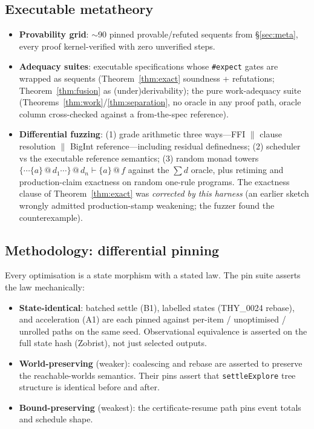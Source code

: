 \documentclass[11pt]{article}
\makeatletter
\newcommand{\lax}[2]{\{#1\}\mathbin{@}#2}       %
\theoremstyle{definition}
\theoremstyle{remark}
\makeatother
\begin{document}
\subsection{Executable metatheory}

\begin{itemize}
\item \textbf{Provability grid}: $\sim$90 pinned provable/refuted sequents from
  \S\ref{sec:meta}, every proof kernel-verified with zero unverified steps.
\item \textbf{Adequacy suites}: executable specifications whose \texttt{\#expect}
  gates are wrapped as sequents (Theorem~\ref{thm:exact} soundness + refutations;
  Theorem~\ref{thm:fusion} as (under)derivability); the pure work-adequacy suite
  (Theorems~\ref{thm:work}/\ref{thm:separation}, no oracle in any proof path,
  oracle column cross-checked against a from-the-spec reference).
\item \textbf{Differential fuzzing}: (1) grade arithmetic three ways---FFI $\|$
  clause resolution $\|$ BigInt reference---including residual definedness; (2)
  scheduler vs the executable reference semantics; (3) random monad towers
  $\lax{\cdots\lax{a}{d_1}\cdots}{d_n} \vdash \lax{a}{f}$ against the $\sum d$
  oracle, plus retiming and production-claim exactness on random one-rule programs.
  The exactness clause of Theorem~\ref{thm:exact} was \emph{corrected by this
  harness} (an earlier sketch wrongly admitted production-stamp weakening; the
  fuzzer found the counterexample).
\end{itemize}

\subsection{Methodology: differential pinning}

Every optimisation is a state morphism with a stated law.  The pin suite asserts
the law mechanically:

\begin{itemize}
\item \textbf{State-identical}: batched settle (B1), labelled states
  (THY\_0024 rebase), and acceleration (A1) are each pinned against per-item /
  unoptimised / unrolled paths on the same seed.  Observational equivalence is
  asserted on the full state hash (Zobrist), not just selected outputs.
\item \textbf{World-preserving} (weaker): coalescing and rebase are asserted to
  preserve the reachable-worlds semantics.  Their pins assert that
  \texttt{settleExplore} tree structure is identical before and after.
\item \textbf{Bound-preserving} (weakest): the certificate-resume path pins event
  totals and schedule shape.
\end{itemize}
\end{document}
